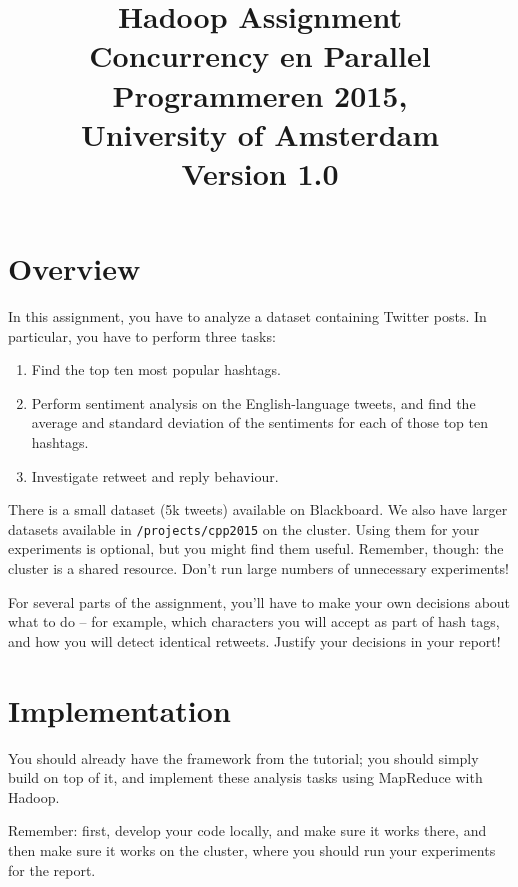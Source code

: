 \documentclass[a4paper,10pt]{article}
\date{}
\title{Hadoop Assignment\\
  Concurrency en Parallel Programmeren 2015,\\
  University of Amsterdam\\
  Version 1.0
}
\begin{document}
  \maketitle
  
  \tableofcontents
  
  \section{Overview}
  
  In this assignment, you have to analyze a dataset containing Twitter posts. In particular, you have to perform three tasks:

  \begin{enumerate}
    \item Find the top ten most popular hashtags.
    \item Perform sentiment analysis on the English-language tweets, and find the average and standard deviation of the sentiments for each of those top ten hashtags.
    \item Investigate retweet and reply behaviour.
  \end{enumerate}

  There is a small dataset (5k tweets) available on Blackboard. We also have larger datasets available in \texttt{/projects/cpp2015} on the cluster. Using them for your experiments is optional, but you might find them useful. Remember, though: the cluster is a shared resource. Don't run large numbers of unnecessary experiments!

  For several parts of the assignment, you'll have to make your own decisions about what to do -- for example, which characters you will accept as part
  of hash tags, and how you will detect identical retweets. Justify your decisions in your report!

  \section{Implementation}

  You should already have the framework from the tutorial; you should simply build on top of it, and implement these analysis tasks using MapReduce with Hadoop.
  
  Remember: first, develop your code locally, and make sure it works there, and then make sure it works on the cluster, where you should run your experiments
  for the report.
  
\end{document}
